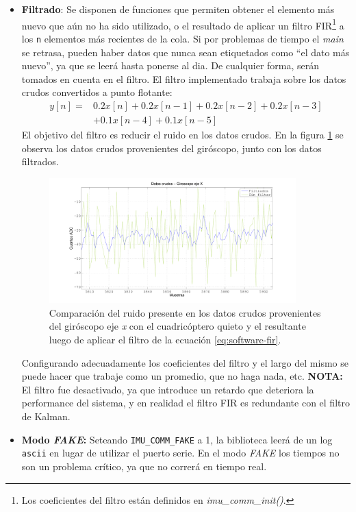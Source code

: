 \documentclass[main]{subfiles}
\begin{document}
\begin{itemize}
\item \textbf{Filtrado}: Se disponen de funciones que permiten obtener el elemento m\'as nuevo que a\'un no ha sido utilizado, o el resultado de aplicar un filtro FIR\footnote{Los coeficientes del filtro est\'an definidos en \textit{imu\_comm\_init()}.} a los \verb+n+ elementos m\'as recientes de la cola. Si por problemas de tiempo el \textit{main} se retrasa, pueden haber datos que nunca sean etiquetados como ``el dato m\'as nuevo'', ya que se leer\'a hasta ponerse al dia. De cualquier forma, ser\'an tomados en cuenta en el filtro.\newline
El filtro implementado trabaja sobre los datos crudos convertidos a punto flotante:
\begin{equation}
  \label{eq:software-fir}
\begin{split}
  y[n] =& 0.2x[n] + 0.2x[n-1] + 0.2x[n-2] + 0.2x[n-3] \\
  & + 0.1x[n-4] + 0.1x[n-5]
\end{split}
\end{equation}
El objetivo del filtro es reducir el ruido en los datos crudos. En la figura \ref{fig:software:gyro-x-filtro.png} se observa los datos crudos provenientes del gir\'oscopo, junto con los datos filtrados.
\begin{figure}[h!]
\centering
  \includegraphics[width=0.9\textwidth]{./pics_software/gyro_x_filtro.pdf}
\caption{Comparaci\'on del ruido presente en los datos crudos provenientes del gir\'oscopo eje \textit{x} con el cuadric\'optero quieto y el resultante luego de aplicar el filtro de la ecuaci\'on \ref{eq:software-fir}.}
\vspace{-20pt}
\label{fig:software:gyro-x-filtro.png}
\end{figure}

Configurando adecuadamente los coeficientes del filtro y el largo del mismo se puede hacer que trabaje como un promedio, que no haga nada, etc.\newpage
\textbf{NOTA:} El filtro fue desactivado, ya que introduce un retardo que deteriora la performance del sistema, y en realidad el filtro FIR es redundante con el filtro de Kalman.
\item \textbf{Modo \textit{FAKE}:} Seteando \verb+IMU_COMM_FAKE+ a 1, la biblioteca leerá de un log \verb+ascii+ en lugar de utilizar el puerto serie. En el modo \textit{FAKE} los tiempos no son un problema cr\'itico, ya que no correr\'a en tiempo real.


\end{itemize}
\end{document}
